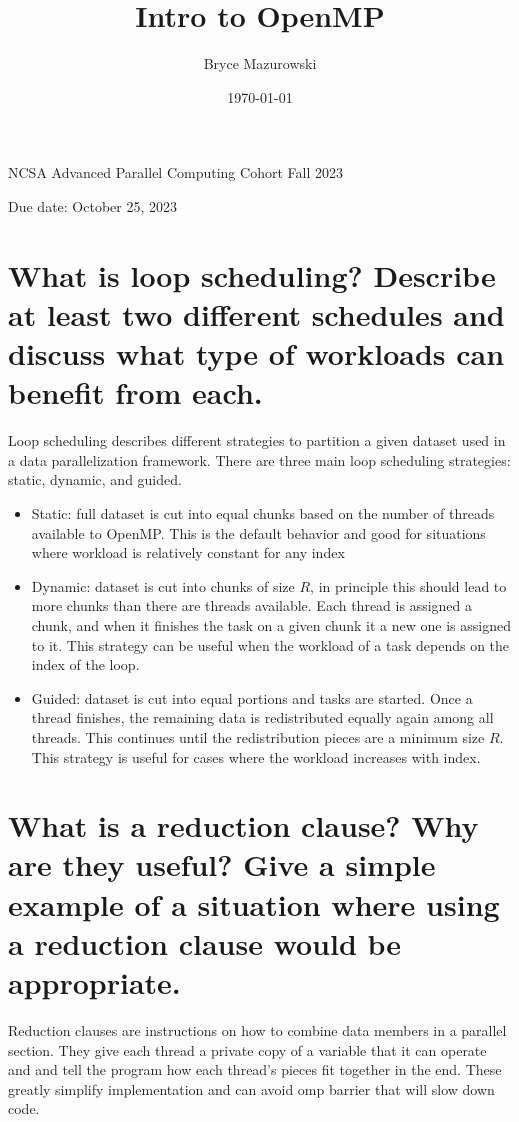 \documentclass[11pt]{article}
\author{Bryce Mazurowski}
\date{\today}
\title{Intro to OpenMP}
\begin{document}
\maketitle
NCSA Advanced Parallel Computing Cohort
Fall 2023

Due date: October 25, 2023

\section{What is loop scheduling? Describe at least two different schedules and discuss what type of workloads can benefit from each.}
\label{sec:org07bd50c}
Loop scheduling describes different strategies to partition a given
dataset used in a data parallelization framework. There are three main
loop scheduling strategies: static, dynamic, and guided.
\begin{itemize}
\item Static: full dataset is cut into equal chunks based on the number of
threads available to OpenMP. This is the default behavior and good
for situations where workload is relatively constant for any index
\item Dynamic: dataset is cut into chunks of size \(R\), in principle this
should lead to more chunks than there are threads available. Each
thread is assigned a chunk, and when it finishes the task on a given
chunk it a new one is assigned to it. This strategy can be useful
when the workload of a task depends on the index of the loop.
\item Guided: dataset is cut into equal portions and tasks are
started. Once a thread finishes, the remaining data is redistributed
equally again among all threads. This continues until the
redistribution pieces are a minimum size \(R\). This strategy is
useful for cases where the workload increases with index.
\end{itemize}

\section{What is a reduction clause? Why are they useful? Give a simple example of a situation where using a reduction clause would be appropriate.}
\label{sec:org8f0b93d}
Reduction clauses are instructions on how to combine data
members in a parallel section. They give each thread a private copy of
a variable that it can operate and and tell the program how each
thread's pieces fit together in the end. These greatly simplify
implementation and can avoid omp barrier that will slow down code.
\end{document}
